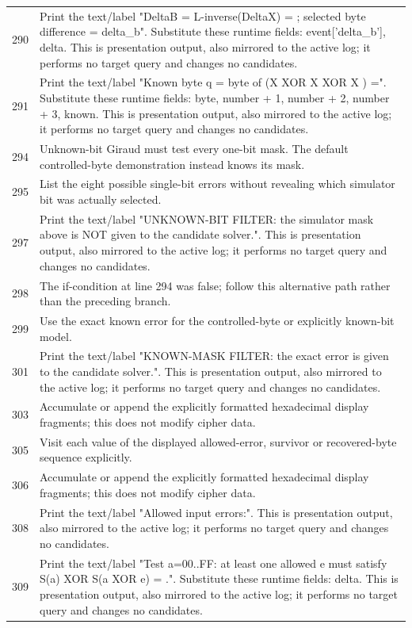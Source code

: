 \begin{longtable}{r >{\raggedright\arraybackslash}p{138mm}}
290&Print the text/label "DeltaB = L-inverse(DeltaX) =  ; selected byte difference =  delta\_b". Substitute these runtime fields: event['delta\_b'], delta. This is presentation output, also mirrored to the active log; it performs no target query and changes no candidates.\\
291&Print the text/label "Known byte q = byte   of (X  XOR X  XOR X ) =". Substitute these runtime fields: byte, number + 1, number + 2, number + 3, known. This is presentation output, also mirrored to the active log; it performs no target query and changes no candidates.\\
294&Unknown-bit Giraud must test every one-bit mask. The default controlled-byte demonstration instead knows its mask.\\
295&List the eight possible single-bit errors without revealing which simulator bit was actually selected.\\
297&Print the text/label "UNKNOWN-BIT FILTER: the simulator mask above is NOT given to the candidate solver.". This is presentation output, also mirrored to the active log; it performs no target query and changes no candidates.\\
298&The if-condition at line 294 was false; follow this alternative path rather than the preceding branch.\\
299&Use the exact known error for the controlled-byte or explicitly known-bit model.\\
301&Print the text/label "KNOWN-MASK FILTER: the exact error is given to the candidate solver.". This is presentation output, also mirrored to the active log; it performs no target query and changes no candidates.\\
303&Accumulate or append the explicitly formatted hexadecimal display fragments; this does not modify cipher data.\\
305&Visit each value of the displayed allowed-error, survivor or recovered-byte sequence explicitly.\\
306&Accumulate or append the explicitly formatted hexadecimal display fragments; this does not modify cipher data.\\
308&Print the text/label "Allowed input errors:". This is presentation output, also mirrored to the active log; it performs no target query and changes no candidates.\\
309&Print the text/label "Test a=00..FF: at least one allowed e must satisfy S(a) XOR S(a XOR e) =  .". Substitute these runtime fields: delta. This is presentation output, also mirrored to the active log; it performs no target query and changes no candidates.\\

\end{longtable}
